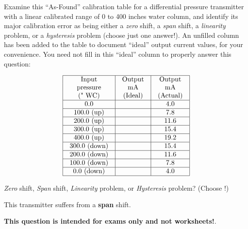 

Examine this ``As-Found'' calibration table for a differential pressure transmitter with a linear calibrated range of 0 to 400 inches water column, and identify its major calibration error as being either a {\it zero} shift, a {\it span} shift, a {\it linearity} problem, or a {\it hysteresis} problem (choose just one answer!).  An unfilled column has been added to the table to document ``ideal'' output current values, for your convenience.  You need not fill in this ``ideal'' column to properly answer this question:


$$\vbox{\offinterlineskip
\halign{\strut
\vrule \quad\hfil # \ \hfil & 
\vrule \quad\hfil # \ \hfil & 
\vrule \quad\hfil # \ \hfil \vrule \cr
\noalign{\hrule}
%
Input & Output & Output \cr
%
pressure & mA & mA \cr
%
(" WC) & (Ideal) & (Actual) \cr
%
\noalign{\hrule}
%
0.0 & & 4.0 \cr
%
\noalign{\hrule}
%
100.0 (up) & & 7.8 \cr
%
\noalign{\hrule}
%
200.0 (up) & & 11.6 \cr
%
\noalign{\hrule}
300.0 (up) & & 15.4 \cr
%
\noalign{\hrule}
%
400.0 (up) & & 19.2 \cr
%
\noalign{\hrule}
%
300.0 (down) & & 15.4 \cr
%
\noalign{\hrule}
%
200.0 (down) & & 11.6 \cr
%
\noalign{\hrule}
%
100.0 (down) & & 7.8 \cr
%
\noalign{\hrule}
%
0.0 (down) & & 4.0 \cr
%
\noalign{\hrule}
} %
}$$ %

{\it Zero} shift, {\it Span} shift, {\it Linearity} problem, or {\it Hysteresis} problem?  (Choose !)







This transmitter suffers from a {\bf span} shift.







{\bf This question is intended for exams only and not worksheets!}.


